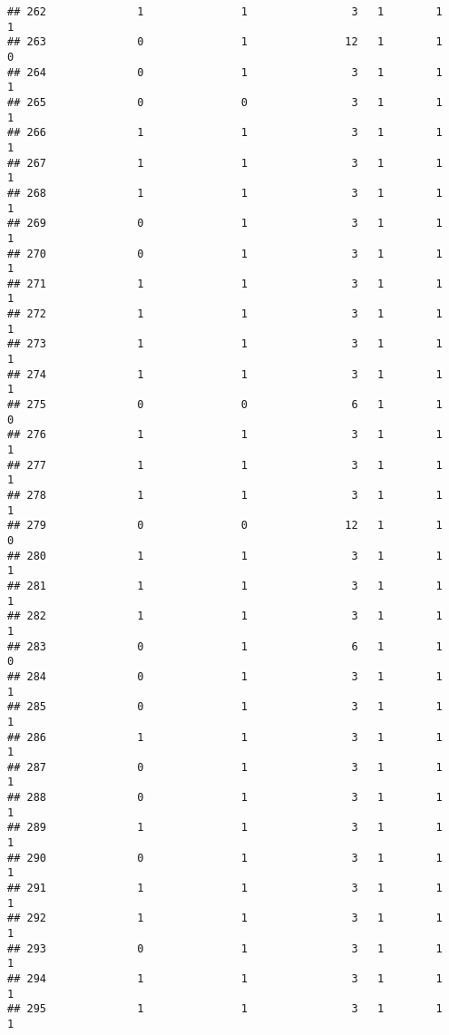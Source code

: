 \documentclass[]{article}
\begin{document}
\begin{verbatim}
## 262              1               1                3   1        1        1
## 263              0               1               12   1        1        0
## 264              0               1                3   1        1        1
## 265              0               0                3   1        1        1
## 266              1               1                3   1        1        1
## 267              1               1                3   1        1        1
## 268              1               1                3   1        1        1
## 269              0               1                3   1        1        1
## 270              0               1                3   1        1        1
## 271              1               1                3   1        1        1
## 272              1               1                3   1        1        1
## 273              1               1                3   1        1        1
## 274              1               1                3   1        1        1
## 275              0               0                6   1        1        0
## 276              1               1                3   1        1        1
## 277              1               1                3   1        1        1
## 278              1               1                3   1        1        1
## 279              0               0               12   1        1        0
## 280              1               1                3   1        1        1
## 281              1               1                3   1        1        1
## 282              1               1                3   1        1        1
## 283              0               1                6   1        1        0
## 284              0               1                3   1        1        1
## 285              0               1                3   1        1        1
## 286              1               1                3   1        1        1
## 287              0               1                3   1        1        1
## 288              0               1                3   1        1        1
## 289              1               1                3   1        1        1
## 290              0               1                3   1        1        1
## 291              1               1                3   1        1        1
## 292              1               1                3   1        1        1
## 293              0               1                3   1        1        1
## 294              1               1                3   1        1        1
## 295              1               1                3   1        1        1

\end{verbatim}
\end{document}
